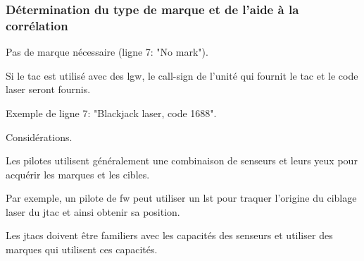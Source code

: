 \subsubsection{Détermination du type de marque et de l'aide à la corrélation} %

\begin{e1}
	
	
	\begin{e2}
		\item Pas de marque nécessaire (ligne 7: "No mark").
		
		\item Si le \gls{tac} est utilisé avec des \gls{lgw}, le call-sign de l'unité qui fournit le \gls{tac} et le code laser seront fournis.
		
		Exemple de ligne 7: "Blackjack laser, code 1688".
	\end{e2}
	
	
	
	\begin{e2}
		
		
		\item{Considérations.}{}
		
		\begin{e3}
			\item Les pilotes utilisent généralement une combinaison de senseurs et leurs yeux pour acquérir les marques et les cibles.
			
			Par exemple, un pilote de \gls{fw} peut utiliser un \gls{lst} pour traquer l'origine du ciblage laser du \gls{jtac} et ainsi obtenir sa position.
			
			Les \glspl{jtac} doivent être familiers avec les capacités des senseurs et utiliser des marques qui utilisent ces capacités.
			

\end{e3}
\end{e2}
\end{e1}
